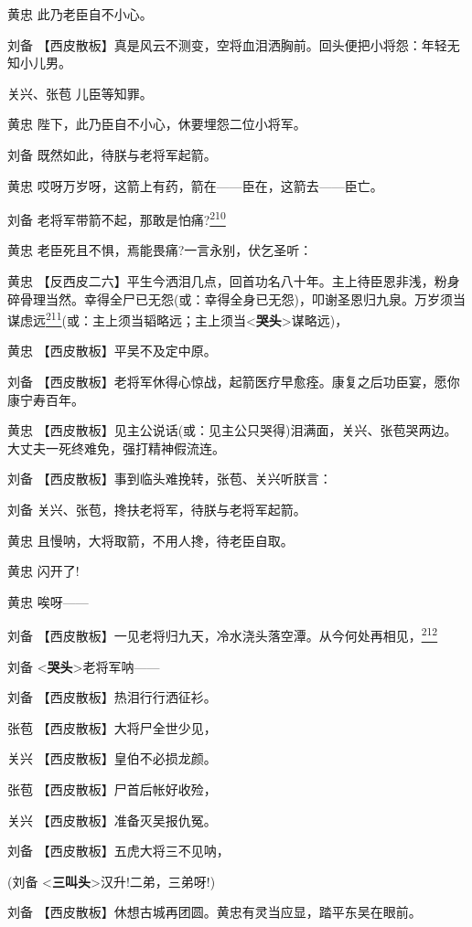 黄忠 此乃老臣自不小心。

刘备
【西皮散板】真是风云不测变，空将血泪洒胸前。回头便把小将怨：年轻无知小儿男。

关兴、张苞 儿臣等知罪。

黄忠 陛下，此乃臣自不小心，休要埋怨二位小将军。

刘备 既然如此，待朕与老将军起箭。

黄忠 哎呀万岁呀，这箭上有药，箭在------臣在，这箭去------臣亡。

刘备
老将军带箭不起，那敢是怕痛?\protect\hyperlink{fn210}{\textsuperscript{210}}

黄忠 老臣死且不惧，焉能畏痛?一言永别，伏乞圣听：

黄忠
【反西皮二六】平生今洒泪几点，回首功名八十年。主上待臣恩非浅，粉身碎骨理当然。幸得全尸已无怨(或：幸得全身已无怨)，叩谢圣恩归九泉。万岁须当谋虑远\protect\hyperlink{fn211}{\textsuperscript{211}}(或：主上须当韬略远；主上须当\textless{}\textbf{哭头}\textgreater{}谋略远)，

黄忠 【西皮散板】平吴不及定中原。

刘备
【西皮散板】老将军休得心惊战，起箭医疗早愈痊。康复之后功臣宴，愿你康宁寿百年。

黄忠
【西皮散板】见主公说话(或：见主公只哭得)泪满面，关兴、张苞哭两边。大丈夫一死终难免，强打精神假流连。

刘备 【西皮散板】事到临头难挽转，张苞、关兴听朕言：

刘备 关兴、张苞，搀扶老将军，待朕与老将军起箭。

黄忠 且慢呐，大将取箭，不用人搀，待老臣自取。

黄忠 闪开了!

黄忠 唉呀------

刘备
【西皮散板】一见老将归九天，冷水浇头落空潭。从今何处再相见，\protect\hyperlink{fn212}{\textsuperscript{212}}

刘备 \textless{}\textbf{哭头}\textgreater{}老将军呐------

刘备 【西皮散板】热泪行行洒征衫。

张苞 【西皮散板】大将尸全世少见，

关兴 【西皮散板】皇伯不必损龙颜。

张苞 【西皮散板】尸首后帐好收殓，

关兴 【西皮散板】准备灭吴报仇冤。

刘备 【西皮散板】五虎大将三不见呐，

(刘备 \textless{}\textbf{三叫头}\textgreater{}汉升!二弟，三弟呀!)

刘备 【西皮散板】休想古城再团圆。黄忠有灵当应显，踏平东吴在眼前。

